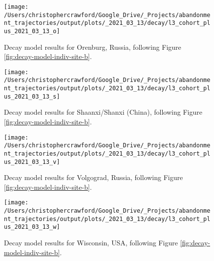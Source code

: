 \documentclass[9pt,twocolumn,twoside,]{pnas-new}
\begin{document}
\begin{figure}
\texttt{[image: /Users/christophercrawford/Google\_Drive/\_Projects/abandonment\_trajectories/output/plots/\_2021\_03\_13/decay/l3\_cohort\_plus\_2021\_03\_13\_o]} \caption{Decay model results for Orenburg, Russia, following Figure \ref{fig:decay-model-indiv-site-b}.}\label{fig:decay-model-indiv-site-o}
\end{figure}

\begin{figure}
\texttt{[image: /Users/christophercrawford/Google\_Drive/\_Projects/abandonment\_trajectories/output/plots/\_2021\_03\_13/decay/l3\_cohort\_plus\_2021\_03\_13\_s]} \caption{Decay model results for Shaanxi/Shanxi (China), following Figure \ref{fig:decay-model-indiv-site-b}.}\label{fig:decay-model-indiv-site-s}
\end{figure}

\begin{figure}
\texttt{[image: /Users/christophercrawford/Google\_Drive/\_Projects/abandonment\_trajectories/output/plots/\_2021\_03\_13/decay/l3\_cohort\_plus\_2021\_03\_13\_v]} \caption{Decay model results for Volgograd, Russia, following Figure \ref{fig:decay-model-indiv-site-b}.}\label{fig:decay-model-indiv-site-v}
\end{figure}

\begin{figure}
\texttt{[image: /Users/christophercrawford/Google\_Drive/\_Projects/abandonment\_trajectories/output/plots/\_2021\_03\_13/decay/l3\_cohort\_plus\_2021\_03\_13\_w]} \caption{Decay model results for Wisconsin, USA, following Figure \ref{fig:decay-model-indiv-site-b}.}\label{fig:decay-model-indiv-site-w}
\end{figure}

\showmatmethods
\showacknow
\pnasbreak



% 
\end{document}
